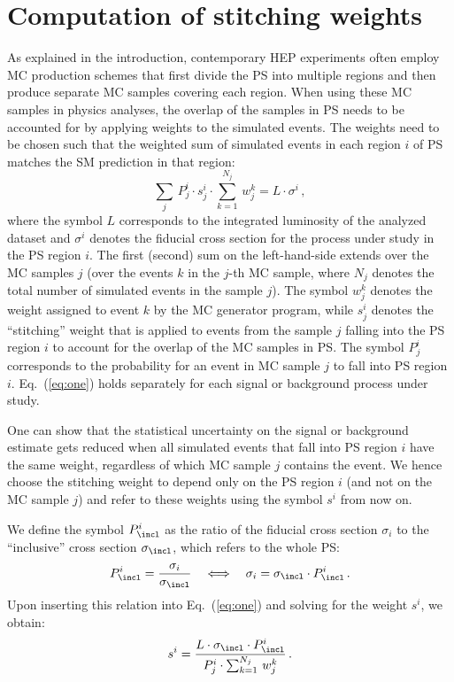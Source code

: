 \section{Computation of stitching weights}
\label{sec:stitching_weights}

As explained in the introduction,
contemporary HEP experiments often employ MC production schemes
that first divide the PS into multiple regions and then produce separate MC samples covering each region.
When using these MC samples in physics analyses,
the overlap of the samples in PS needs to be accounted for by applying weights to the simulated events.
The weights need to be chosen such that the weighted sum of simulated events in each region $i$ of PS 
matches the SM prediction in that region:
\begin{equation}
\sum_{j} \, P_{j}^{i} \cdot s_{j}^{i} \cdot \sum_{k=1}^{N_{j}} \, w_{j}^{k} = L \cdot \sigma^{i} \, ,
\label{eq:one}
\end{equation}
where the symbol $L$ corresponds to the integrated luminosity of the analyzed dataset
and $\sigma^{i}$ denotes the fiducial cross section for the process under study in the PS region $i$.
The first (second) sum on the left-hand-side extends over the MC samples $j$ 
(over the events $k$ in the $j$-th MC sample, where $N_{j}$ denotes the total number of simulated events in the sample $j$).
The symbol $w_{j}^{k}$ denotes the weight assigned to event $k$ by the MC generator program,
while $s_{j}^{i}$ denotes the ``stitching'' weight that is applied to events from the sample $j$ falling into the PS region $i$ to account for the overlap of the MC samples in PS.
The symbol $P_{j}^{i}$ corresponds to the probability for an event in MC sample $j$ to fall into PS region $i$.
Eq.~(\ref{eq:one}) holds separately for each signal or background process under study.

One can show that the statistical uncertainty on the signal or background estimate
gets reduced when all simulated events that fall into PS region $i$ have the same weight,
regardless of which MC sample $j$ contains the event.
We hence choose the stitching weight to depend only on the PS region $i$ (and not on the MC sample $j$)
and refer to these weights using the symbol $s^{i}$ from now on.

We define the symbol $P_{\incl}^{i}$ as the ratio of the fiducial cross section $\sigma_{i}$ to the ``inclusive'' cross section $\sigma_{\incl}$,
which refers to the whole PS:
\begin{equation*}
P_{\incl}^{i} = \frac{\sigma_{i}}{\sigma_{\incl}} \quad \Longleftrightarrow \quad \sigma_{i} = \sigma_{\incl} \cdot P_{\incl}^{i} \, .
\label{eq:two}
\end{equation*}
Upon inserting this relation into Eq.~(\ref{eq:one}) and solving for the weight $s^{i}$, we obtain:
\begin{equation}
s^{i} = \frac{L \cdot \sigma_{\incl} \cdot P_{\incl}^{i}}{P_{j}^{i} \cdot \sum_{k=1}^{N_{j}} \, w_{j}^{k}} \, .
\label{eq:master}
\end{equation}

